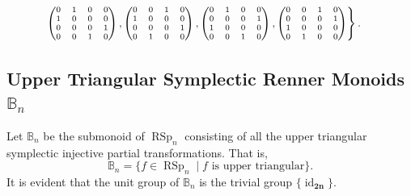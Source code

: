 \documentclass[11pt]{article}
\newcommand{\mb}{\mathbf}
\DeclareMathOperator{\id}{id}
\DeclareMathOperator{\RSp}{RSp}
\begin{document}
        $ \hspace{12mm}      \left.\scriptsize \begin{pmatrix}
                        0&1&0&0\\
                        1&0&0&0\\
                        0&0&0&1\\
                        0&0&1&0\\
                \end{pmatrix},
                \begin{pmatrix}
                        0&0&1&0\\
                        1&0&0&0\\
                        0&0&0&1\\
                        0&1&0&0\\
                \end{pmatrix},
                \begin{pmatrix}
                        0&1&0&0\\
                        0&0&0&1\\
                        1&0&0&0\\
                        0&0&1&0\\
                \end{pmatrix},
                \begin{pmatrix}
                        0&0&1&0\\
                        0&0&0&1\\
                        1&0&0&0\\
                        0&1&0&0\\
                \end{pmatrix}
\right\}.
$


\subsection{Upper Triangular Symplectic Renner Monoids $\mathbb B_n$}
Let $\mathbb B_n$ be the submonoid of $\RSp_n$ consisting of all the upper triangular symplectic injective partial transformations. That is,
\[
    \mathbb B_n = \{f\in \RSp_n \mid f \mbox{ is upper triangular}\}.
\]
It is evident that the unit group of $\mathbb B_n$ is the trivial
group $\{\id_{\mb{2n}}\}$.
\end{document}

